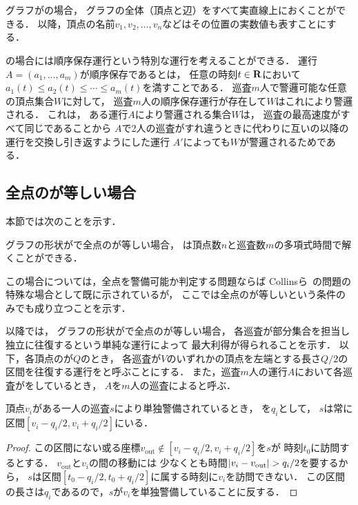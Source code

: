 \section{{\graphLine}}
\label{section: line}

グラフが{\graphLine}の場合，
グラフの全体（頂点と辺）をすべて実直線上におくことができる．
以降，頂点の名前$v_1, v_2, \ldots, v_n$などはその位置の実数値も表すことにする．

{\graphLine}の場合には順序保存運行という特別な運行を考えることができる．
運行$A = (a_1, \ldots, a_m)$が順序保存であるとは，
任意の時刻$t \in \mathbf R$において
$a_1(t) \leq a_2(t) \leq \cdots \leq a_m(t)$を満すことである．
巡査$m$人で警邏可能な任意の頂点集合$W$に対して，
巡査$m$人の順序保存運行が存在して$W$はこれにより警邏される．
これは，
ある運行$A$により警邏される集合$W$は，
巡査の最高速度がすべて同じであることから
$A$で2人の巡査がすれ違うときに代わりに互いの以降の運行を交換し引き返すようにした運行
$A'$によっても$W$が警邏されるためである．



\subsection{全点の{\maxIdletime}が等しい場合}
\label{subsec:LineUnaryTimelimit}


本節では次のことを示す．

\begin{theo}
\label{theo:LineEqualTimelimit}
グラフの形状が{\graphLine}で全点の{\maxIdletime}が等しい場合，
{\patProb}は頂点数$n$と巡査数$m$の多項式時間で解くことができる．
\end{theo}

この場合については，全点を警備可能か判定する問題ならば
Collinsら~\cite{collins2013optimal}の問題の特殊な場合として既に示されているが，
ここでは全点の{\maxIdletime}が等しいという条件のみでも成り立つことを示す．

以降では，
グラフの形状が{\graphLine}で全点の{\maxIdletime}が等しい場合，
各巡査が部分集合を担当し独立に往復するという単純な運行によって
最大利得が得られることを示す．
以下，各頂点の{\maxIdletime}が$Q$のとき，
各巡査が$V$のいずれかの頂点を左端とする長さ$Q/2$の区間を往復する運行を{\indSectOperation}と呼ぶことにする．
また，巡査$m$人の運行$A$において各巡査が{\indSectOperation}をしているとき，
$A$を$m$人の巡査による{\indSectOperation}と呼ぶ．


\begin{lemm}
  \label{lemm:RangeOfPatrollerOnLine}
  頂点$v_i$がある一人の巡査$s$により単独警備されているとき，
  {\maxIdletime}を$q_i$として，
  $s$は常に区間$[v_i - q_i/2, v_i + q_i/2]$にいる．
\end{lemm}
\begin{proof}
  \newcommand{\vout}{v_{\mathrm{out}}}
  この区間にない或る座標$\vout \notin [v_i - q_i/2, v_i + q_i/2]$を$s$が
  時刻$t_0$に訪問するとする．
  $\vout$と$v_i$の間の移動には
  少なくとも時間$\abs{v_i - \vout} > q _i / 2$を要するから，
  $s$は区間$[t_0 - q _i / 2, t_0 + q _i / 2]$に属する時刻に$v_i$を訪問できない．
  この区間の長さは$
    q_i
  $であるので，$s$が$v _i$を単独警備していることに反する．
\end{proof}


